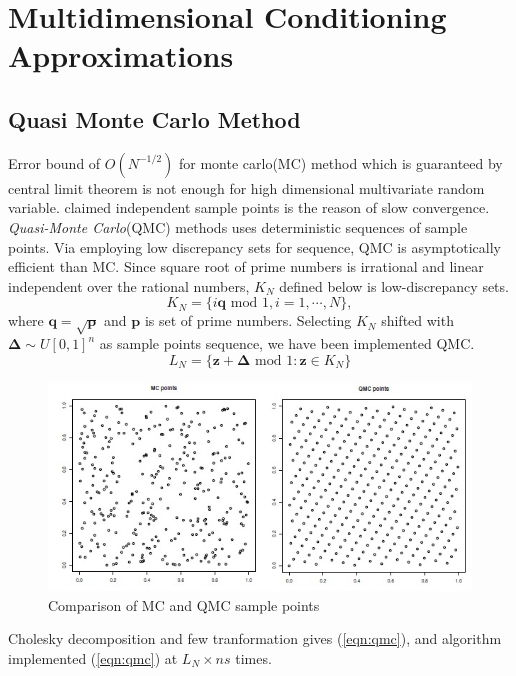 \section{Multidimensional Conditioning Approximations}

\subsection{Quasi Monte Carlo Method}\label{subsec:qmc}

Error bound of $O(N^{-1/2})$ for monte carlo(MC) method which is guaranteed by central limit theorem is not enough for high dimensional multivariate random variable. \citet{genz2009computation} claimed independent sample points is the reason of slow convergence. \textit{Quasi-Monte Carlo}(QMC) methods uses deterministic sequences of sample points. Via employing low discrepancy sets for sequence, QMC is asymptotically efficient than MC.
Since square root of prime numbers is irrational and linear independent over the rational numbers, $K_N$ defined below is low-discrepancy sets.
$$K_N=\{i\mathbf{q}\text{ mod }1,i=1,\cdots,N\},$$
where $\mathbf{q}=\sqrt{\mathbf{p}}$ and $\mathbf{p}$ is set of prime numbers. Selecting $K_N$ shifted with $\boldsymbol{\Delta}\sim U[0,1]^n$ as sample points sequence, we have been implemented QMC.
$$L_N=\{\mathbf{z}+\boldsymbol{\Delta}\text{ mod }1:\mathbf{z}\in K_N\}$$

\begin{figure}[ht]
	\centering
	\includegraphics[width=.5\linewidth]{figs/QMC.jpg}
	\caption{Comparison of MC and QMC sample points\citep{genz2009computation}}
	\label{fig:QMC}
\end{figure}

Cholesky decomposition and few tranformation gives (\ref{eqn:qmc}), and algorithm \label{ref:QMC} implemented (\ref{eqn:qmc}) at $L_N \times ns$ times.

